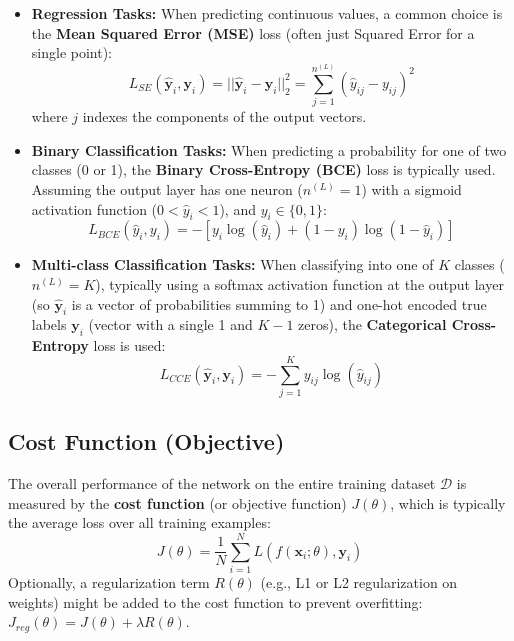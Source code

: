 \documentclass[11pt,twoside,openright]{report}
\begin{document}
\begin{itemize}
    \item \textbf{Regression Tasks:} When predicting continuous values, a common choice is the \textbf{Mean Squared Error (MSE)} loss (often just Squared Error for a single point):
        \begin{equation} \label{eq:mse_point}
            L_{SE}(\hat{\mathbf{y}}_i, \mathbf{y}_i) = || \hat{\mathbf{y}}_i - \mathbf{y}_i ||^2_2 = \sum_{j=1}^{n^{(L)}} (\hat{y}_{ij} - y_{ij})^2
        \end{equation}
        where $j$ indexes the components of the output vectors.

    \item \textbf{Binary Classification Tasks:} When predicting a probability for one of two classes (0 or 1), the \textbf{Binary Cross-Entropy (BCE)} loss is typically used. Assuming the output layer has one neuron ($n^{(L)}=1$) with a sigmoid activation function ($0 < \hat{y}_i < 1$), and $y_i \in \{0, 1\}$:
        \begin{equation} \label{eq:bce}
            L_{BCE}(\hat{y}_i, y_i) = - [ y_i \log(\hat{y}_i) + (1-y_i) \log(1-\hat{y}_i) ]
        \end{equation}

    \item \textbf{Multi-class Classification Tasks:} When classifying into one of $K$ classes ($n^{(L)}=K$), typically using a softmax activation function at the output layer (so $\hat{\mathbf{y}}_i$ is a vector of probabilities summing to 1) and one-hot encoded true labels $\mathbf{y}_i$ (vector with a single 1 and $K-1$ zeros), the \textbf{Categorical Cross-Entropy} loss is used:
        \begin{equation} \label{eq:cce}
            L_{CCE}(\hat{\mathbf{y}}_i, \mathbf{y}_i) = - \sum_{j=1}^{K} y_{ij} \log(\hat{y}_{ij})
        \end{equation}
\end{itemize}

\subsection{Cost Function (Objective)}
The overall performance of the network on the entire training dataset $\mathcal{D}$ is measured by the \textbf{cost function} (or objective function) $J(\theta)$, which is typically the average loss over all training examples:
\begin{equation} \label{eq:cost}
    J(\theta) = \frac{1}{N} \sum_{i=1}^N L(f(\mathbf{x}_i; \theta), \mathbf{y}_i)
\end{equation}
Optionally, a regularization term $R(\theta)$ (e.g., L1 or L2 regularization on weights) might be added to the cost function to prevent overfitting: $J_{reg}(\theta) = J(\theta) + \lambda R(\theta)$.
\end{document}
